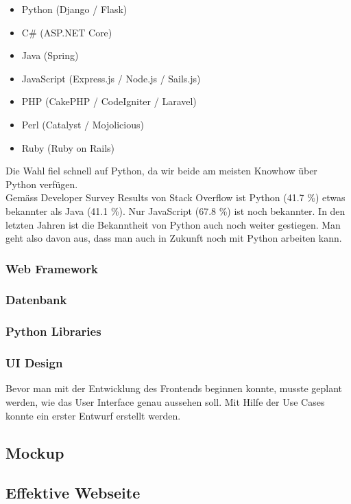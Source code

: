 
\begin{itemize}
	\item Python (Django / Flask)
	\item C\# (ASP.NET Core)
	\item Java (Spring)
	\item JavaScript (Express.js / Node.js / Sails.js)
	\item PHP (CakePHP / CodeIgniter / Laravel)
	\item Perl (Catalyst / Mojolicious)
	\item Ruby (Ruby on Rails)
\end{itemize}


Die Wahl fiel schnell auf Python, da wir beide am meisten Knowhow über Python verfügen. \\
Gemäss Developer Survey Results von Stack Overflow ist Python (41.7 \%) etwas bekannter als Java (41.1 \%). Nur JavaScript (67.8 \%) ist noch bekannter. In den letzten Jahren ist die Bekanntheit von Python auch noch weiter gestiegen. Man geht also davon aus, dass man auch in Zukunft noch mit Python arbeiten kann.

\subsubsection*{Web Framework}

\subsubsection*{Datenbank}

\subsubsection*{Python Libraries}

\subsubsection{UI Design}
Bevor man mit der Entwicklung des Frontends beginnen konnte, musste geplant werden, wie das User Interface genau aussehen soll. Mit Hilfe der Use Cases konnte ein erster Entwurf erstellt werden. 

\subsection{Mockup}

\newpage



\subsection{Effektive Webseite}

\newpage